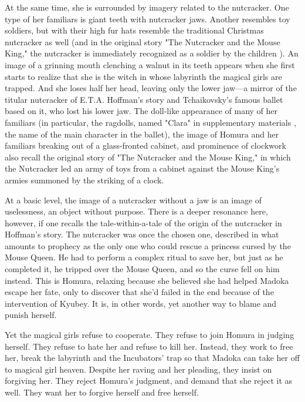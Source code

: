 At the same time, she is surrounded by imagery related to the nutcracker. One type of her familiars is giant teeth with nutcracker jaws. Another resembles toy soldiers, but with their high fur hats resemble the traditional Christmas nutcracker as well (and in the original story "The Nutcracker and the Mouse King," the nutcracker is immediately recognized as a soldier by the children \cite{ref127}). An image of a grinning mouth clenching a walnut in its teeth appears when she first starts to realize that she is the witch in whose labyrinth the magical girls are trapped. And she loses half her head, leaving only the lower jaw—a mirror of the titular nutcracker of E.T.A. Hoffman's story and Tchaikovsky's famous ballet based on it, who lost his lower jaw. The doll-like appearance of many of her familiars (in particular, the ragdolls, named "Clara" in supplementary materials \cite{ref128}, the name of the main character in the ballet), the image of Homura and her familiars breaking out of a glass-fronted cabinet, and prominence of clockwork also recall the original story of "The Nutcracker and the Mouse King," in which the Nutcracker led an army of toys from a cabinet against the Mouse King's armies summoned by the striking of a clock. 

At a basic level, the image of a nutcracker without a jaw is an image of uselessness, an object without purpose. There is a deeper resonance here, however, if one recalls the tale-within-a-tale of the origin of the nutcracker in Hoffman's story. The nutcracker was once the chosen one, described in what amounts to prophecy as the only one who could rescue a princess cursed by the Mouse Queen. He had to perform a complex ritual to save her, but just as he completed it, he tripped over the Mouse Queen, and so the curse fell on him instead. This is Homura, relaxing because she believed she had helped Madoka escape her fate, only to discover that she'd failed in the end because of the intervention of Kyubey. It is, in other words, yet another way to blame and punish herself.

Yet the magical girls refuse to cooperate. They refuse to join Homura in judging herself. They refuse to hate her and refuse to kill her. Instead, they work to free her, break the labyrinth and the Incubators' trap so that Madoka can take her off to magical girl heaven. Despite her raving and her pleading, they insist on forgiving her. They reject Homura's judgment, and demand that she reject it as well. They want her to forgive herself and free herself. 

